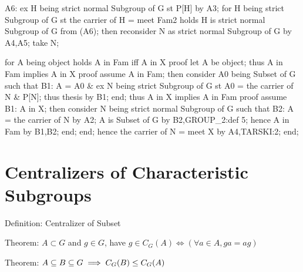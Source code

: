   A6: ex H being strict normal Subgroup of G st P[H] by A3;
  for H being strict Subgroup of G st the carrier of H = meet Fam2
  holds H is strict normal Subgroup of G
  from (A6);
  then reconsider N as strict normal Subgroup of G by A4,A5;
  take N;

  for A being object holds A in Fam iff A in X
  proof
    let A be object;
    thus A in Fam implies A in X
    proof
      assume A in Fam;
      then consider A0 being Subset of G such that
      B1: A = A0 &
          ex N being strict Subgroup of G st A0 = the carrier of N & P[N];
      thus thesis by B1;
    end;
    thus A in X implies A in Fam
    proof
      assume B1: A in X;
      then consider N being strict normal Subgroup of G such that
      B2: A = the carrier of N
      by A2;
      A is Subset of G by B2,GROUP_2:def 5;
      hence A in Fam by B1,B2;
    end;
  end;
  hence the carrier of N = meet X by A4,TARSKI:2;
end;
\eatline
{}\nwendcode{}%

\section{Centralizers of Characteristic Subgroups}\label{sec:characteristic:centralizer}

\nwenddocs{}\endmoddef\nwstartdeflinemarkup{}\nwenddeflinemarkup
\LA{}Definition: Centralizer of Subset~{\nwtagstyle{}}\RA{}

\LA{}Theorem: $A\subset G$ and $g\in G$, have $g\in C_{G}(A)\iff(\forall a\in A, ga=ag)$~{\nwtagstyle{}}\RA{}

\LA{}Theorem: $A\subseteq B\subseteq G\implies C_{G}(B)\leq C_{G}(A)$~{\nwtagstyle{}}\RA{}

